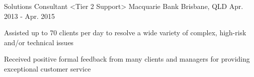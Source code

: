 \begin{cventries}
{\begin{cvitems}
      \end{cvitems}
    }
  \cventry
    {Solutions Consultant <Tier 2 Support>}
    {Macquarie Bank}
    {Brisbane, QLD}
    {Apr. 2013 - Apr. 2015}
    {
      \begin{cvitems}
        \item {Assisted up to 70 clients per day to resolve a wide variety of complex, high-risk and/or technical issues}
        \item {Received positive formal feedback from many clients and managers for providing exceptional customer service}
      \end{cvitems}
    }
  \end{cventries}
